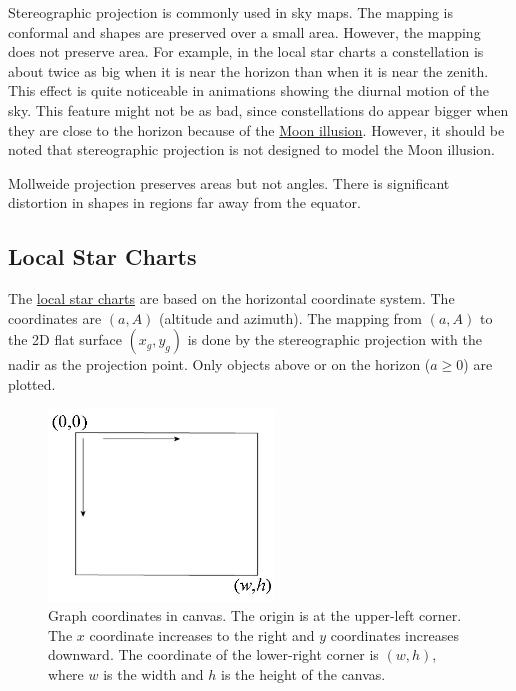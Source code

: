 \documentclass[12pt]{article}
\begin{document}
Stereographic projection is commonly used in sky maps. The mapping is 
conformal and shapes are preserved over a small area. However, 
the mapping does not preserve area. For example, in the local star charts 
a constellation is about twice as big when it is near the horizon than 
when it is near the zenith. This effect is quite noticeable in animations 
showing the diurnal motion of the sky. This feature might not be as bad, 
since constellations do appear bigger when they are close to the horizon 
because of the \href{https://www.skyandtelescope.com/observing/moon-illusion-confusion11252015/}{Moon illusion}. 
However, it should be noted that stereographic projection is not 
designed to model the Moon illusion.

Mollweide projection preserves areas but not angles. There is significant 
distortion in shapes in regions far away from the equator.

\subsection{Local Star Charts}

The \href{../sidereal.html}{local star charts} are based on the horizontal 
coordinate system. The coordinates are $(a,A)$ (altitude and azimuth). The mapping 
from $(a,A)$ to the 2D flat surface $(x_g,y_g)$ is done by the stereographic projection 
with the nadir as the projection point. 
Only objects above or on the horizon ($a \geq 0$) are plotted.

\begin{figure}[h]
\begin{center}
\includegraphics[width=6cm]{computerGraphics.jpg}
\end{center}
\caption{Graph coordinates in canvas. The origin is at the upper-left corner. 
The $x$ coordinate increases to the right and $y$ coordinates increases downward. 
The coordinate of the lower-right corner is $(w,h)$, where $w$ is the width 
and $h$ is the height of the canvas.}
\label{fig:computerGraphics}
\end{figure}
\end{document}
